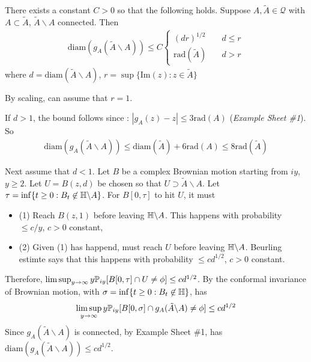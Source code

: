 \documentclass[12pt,a4paper]{article}
\newenvironment{proof}
{\begin{changemargin}{0.5cm}{0.5cm} 
	}%
	{\end{changemargin}
}
\renewenvironment{i}
{\begin{itemize} 
	}%
	{\end{itemize}
}
\newenvironment{p}
{\begin{proof} 
	}%
	{\end{proof}
}
\begin{document}
\prop There exists a constant $C>0$ so that the following holds. Suppose $A, \tilde{A} \in \mathscr{Q}$ with $A\subset \tilde{A}$, $\tilde{A}\backslash A$ connected. Then
\begin{align*}
\text{diam}(g_A(\tilde{A}\backslash A))\leq C \begin{cases}
(dr)^{1/2} & \quad d\leq r \\
\text{rad}(\tilde{A}) & \quad d>r
\end{cases}
\end{align*}
where $d = \text{diam}(\tilde{A} \backslash A)$, $r =\sup \{\text{Im}(z) : z \in \tilde{A} \}$
\begin{p}
\pf By scaling, can assume that $r=1$.

\quad If $d>1$, the bound follows since : $|g_A(z)-z| \leq 3\text{rad}(A)$ (\emph{Example Sheet \#1}). So
\begin{align*}
\text{diam}(g_A(\tilde{A}\backslash A)) \leq \text{diam}(\tilde{A}) + 6 \text{rad}(A) \leq 8 \text{rad}(\tilde{A})
\end{align*}

\quad Next assume that $d<1$. Let $B$ be a complex Brownian motion starting from $iy$, $y\geq 2$. Let $U =B(z,d)$ be chosen so that $U \supset \tilde{A} \backslash A$. Let $\tau = \inf \{t\geq 0: B_t \not\in \mathbb{H} \backslash A \}$. For $B[0, \tau]$ to hit $U$, it must 
\begin{i}
\item[(1)] Reach $B(z,1)$ before leaving $\mathbb{H} \backslash A$. This happens with probability $\leq c/y$, $c>0$ constant,
\item[(2)] Given (1) has happend, must reach $U$ before leaving $\mathbb{H}\backslash A$. Beurling estimte says that this happens with probability $\leq cd^{1/2}$, $c>0$ constant.
\end{i}
Therefore, $\limsup_{y\rightarrow \infty} y \mathbb{P}_{iy} [B[0, \tau] \cap U \neq \phi] \leq cd^{1/2}$. By the conformal invariance of Brownian motion, with $\sigma = \inf\{t\geq 0 : B_t \not\in \mathbb{H} \}$, has
\begin{align*}
\limsup_{y\rightarrow \infty} y\mathbb{P}_{iy} [B[0, \sigma] \cap g_A(\tilde{A}\backslash A) \neq \phi]\leq cd^{1/2}
\end{align*}
Since $g_A(\tilde{A} \backslash A)$ is connected, by Example Sheet \#1, has $\text{diam}(g_A(\tilde{A} \backslash A))\leq cd^{1/2}$.

\eop
\end{p}
\s
\end{document}
